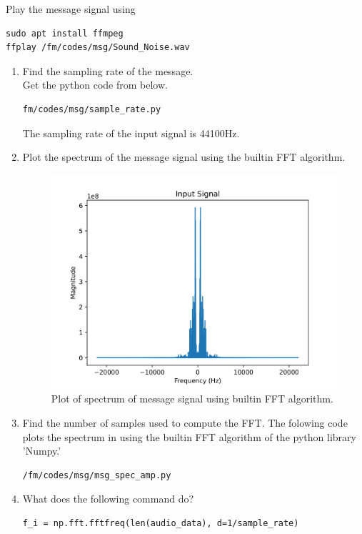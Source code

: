 Play the message signal using
\begin{lstlisting}
sudo apt install ffmpeg
ffplay /fm/codes/msg/Sound_Noise.wav
\end{lstlisting}
\begin{enumerate}[label=\arabic*.,ref=\thesection.\theenumi]
\item Find the sampling rate of the message.
\\

	\solution
	Get the python code from below.
\begin{lstlisting}
fm/codes/msg/sample_rate.py
\end{lstlisting}
The sampling rate of the input signal is 44100Hz.
\item Plot the spectrum of the message signal using the builtin FFT algorithm.\\
	\solution		
\begin{figure}[H]
\centering
\includegraphics[width=\columnwidth]{fm/msg/figs/FFTbuiltin/inputs-1.png}
\caption{Plot of spectrum of message signal using builtin FFT algorithm.}
\label{fig:FFTb}
\end{figure}
\item Find the number of samples used to compute the FFT.
The folowing code plots the spectrum in  using the builtin FFT algorithm of the python library 'Numpy.'
\begin{lstlisting}
/fm/codes/msg/msg_spec_amp.py
\end{lstlisting}
\item What does the following command do?
\begin{lstlisting}
f_i = np.fft.fftfreq(len(audio_data), d=1/sample_rate)
\end{lstlisting}


\end{enumerate}

